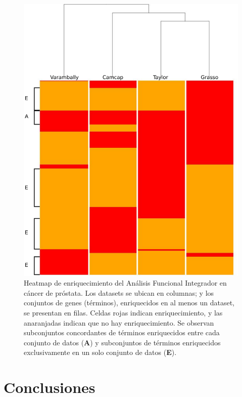 \documentclass[12pt,twoside]{reedthesis}
\begin{document}
\newpage
\begin{figure}

{\centering \includegraphics[width=1\linewidth]{images/IFA_FIG6} 

}

\caption{Heatmap de enriquecimiento del Análisis Funcional Integrador en cáncer de próstata. Los datasets se ubican en columnas; y los conjuntos de genes (términos), enriquecidos en al menos un dataset, se presentan en filas. Celdas rojas indican enriquecimiento, y las anaranjadas indican que no hay enriquecimiento. Se observan subconjuntos concordantes de términos enriquecidos entre cada conjunto de datos (\textbf{A}) y subconjuntos de términos enriquecidos exclusivamente en un solo conjunto de datos (\textbf{E}).}\label{fig:ifa6}
\end{figure}


\hypertarget{conclusiones}{%
\section{Conclusiones}\label{conclusiones}}
\end{document}
